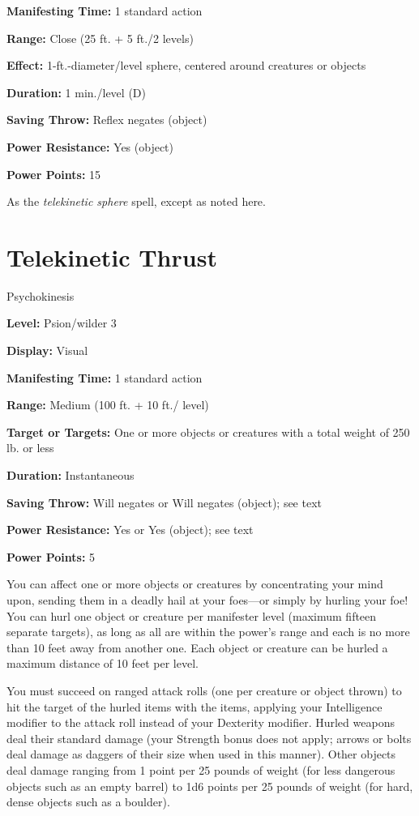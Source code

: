\documentclass{article}
\begin{document}
\textbf{Manifesting Time:} 1 standard action

\textbf{Range:} Close (25 ft. + 5 ft./2 levels)

\textbf{Effect:} 1-ft.-diameter/level sphere, centered around creatures or objects

\textbf{Duration:} 1 min./level (D)

\textbf{Saving Throw:} Reflex negates (object)

\textbf{Power Resistance:} Yes (object)

\textbf{Power Points:} 15

As the \textit{telekinetic sphere }spell, except as noted here.

\vspace{12pt}
\section*{Telekinetic Thrust}

Psychokinesis

\textbf{Level:} Psion/wilder 3

\textbf{Display:} Visual

\textbf{Manifesting Time:} 1 standard action

\textbf{Range:} Medium (100 ft. + 10 ft./ level)

\textbf{Target or Targets:} One or more objects or creatures with a total weight 
of 250 lb. or less

\textbf{Duration:} Instantaneous

\textbf{Saving Throw:} Will negates or Will negates (object); see text

\textbf{Power Resistance:} Yes or Yes (object); see text

\textbf{Power Points:} 5

You can affect one or more objects or creatures by concentrating your mind upon, 
sending them in a deadly hail at your foes---or simply by hurling your foe! You 
can hurl one object or creature per manifester level (maximum fifteen separate 
targets), as long as all are within the power's range and each is no more than 
10 feet away from another one. Each object or creature can be hurled a maximum 
distance of 10 feet per level.

You must succeed on ranged attack rolls (one per creature or object thrown) to 
hit the target of the hurled items with the items, applying your Intelligence modifier 
to the attack roll instead of your Dexterity modifier. Hurled weapons deal their 
standard damage (your Strength bonus does not apply; arrows or bolts deal damage 
as daggers of their size when used in this manner). Other objects deal damage ranging 
from 1 point per 25 pounds of weight (for less dangerous objects such as an empty 
barrel) to 1d6 points per 25 pounds of weight (for hard, dense objects such as 
a boulder).
\end{document}
